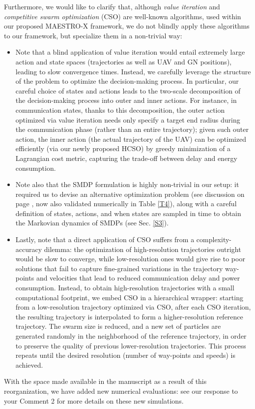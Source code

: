 \documentclass[12pt, draftcls, onecolumn]{IEEEtran}
\theoremstyle{plain}
\theoremstyle{definition}
\theoremstyle{remark}
\begin{document}
\begin{enumerate}
    Furthermore, we would like to clarify that, although \emph{value iteration} and \emph{competitive swarm optimization} (CSO) are well-known algorithms, used within our proposed MAESTRO-X framework, we do not blindly apply these algorithms to our framework, but specialize them in a non-trivial way:
    \begin{itemize}
        \item Note that a blind application of value iteration would entail extremely large action and state spaces (trajectories as well as UAV and GN positions), leading to slow convergence times. Instead, we carefully leverage the structure of the problem to optimize the decision-making process. In particular, our careful choice of states and actions leads to the two-scale decomposition of the decision-making process into outer and inner actions. For instance, in communication states, thanks to this decomposition, the outer action optimized via value iteration needs only specify a target end radius during the communication phase (rather than an entire trajectory); given such outer action, the inner action (the actual trajectory of the UAV) can be optimized efficiently (via our newly proposed HCSO) by greedy minimization of a Lagrangian cost metric, capturing the trade-off between delay and energy consumption.
         \item Note also that the SMDP formulation is highly non-trivial in our setup: it required us to devise an alternative optimization problem (see discussion on page \pageref{altopt}, now also validated numerically in Table \ref{T4}), along with a careful definition of states, actions, and when states are sampled in time to obtain the Markovian dynamics of SMDPs (see Sec. \ref{S3}).
        \item Lastly, note that a direct application of CSO suffers from a complexity-accuracy dilemma: the optimization of high-resolution trajectories outright would be slow to converge, while low-resolution ones would give rise to poor solutions that fail to capture fine-grained variations in the trajectory way-points and velocities that lead to reduced communication delay and power consumption. Instead, to obtain high-resolution trajectories with a small computational footprint, we embed CSO in a hierarchical wrapper: starting from a low-resolution trajectory optimized via CSO, after each CSO iteration, the resulting trajectory is interpolated to form a higher-resolution reference trajectory. The swarm size is reduced, and a new set of particles are generated randomly in the neighborhood of the reference trajectory, in order to preserve the quality of previous lower-resolution trajectories. This process repeats until the desired resolution (number of way-points and speeds) is achieved.
    \end{itemize}
    \vspace{2mm}

    With the space made available in the manuscript as a result of this reorganization, we have added new numerical evaluations: see our response to your Comment 2 for more details on these new simulations.
\end{enumerate}
\clearpage
\end{document}
